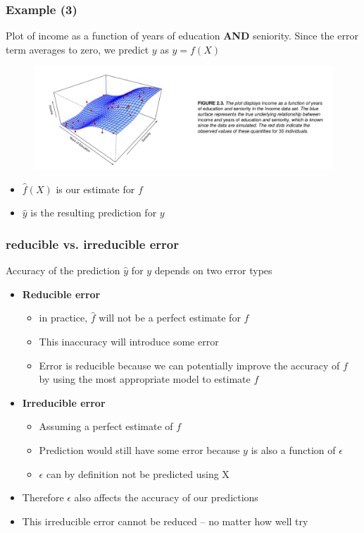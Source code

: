 \documentclass{beamer}
\begin{document}
\begin{frame}
\frametitle{Example (3) }
Plot of income as a function of years of education \textbf{AND} seniority.
\newline
Since the error term averages to zero, we predict $y$ as $y = f(X)$
\begin{figure}
\includegraphics[width = 1\linewidth]{figures/03/figure_2_3.png}
\end{figure}

\begin{itemize}
\item $\hat{f}(X)$ is our estimate for $f$
\item $\hat{y}$ is the resulting prediction for $y$
\end{itemize}
\end{frame}


\begin{frame}
\frametitle{reducible vs. irreducible error}
Accuracy of the prediction $\hat{y}$ for $y$ depends on two error types
\begin{itemize}
\item \textbf{Reducible error }
		\begin{itemize}
		\item in practice, $\hat{f}$ will not be a perfect estimate for $f$
        \item This inaccuracy will introduce some error
        \item Error is reducible because we can potentially improve the accuracy of $f$ by
using the most appropriate model to estimate $f$
		\end{itemize}
        \item \textbf{Irreducible error}
        \begin{itemize}
        \item Assuming a perfect estimate of $f$
        \item Prediction would still have some error because $y$ is also a function of $\epsilon$
        \item $\epsilon$‪ can by definition not be predicted using X
        \end{itemize}
        \item Therefore $\epsilon$ ‪also affects the accuracy of our predictions
        \item This irreducible error cannot be reduced – no matter how well try
\end{itemize}
\end{frame}
\end{document}
